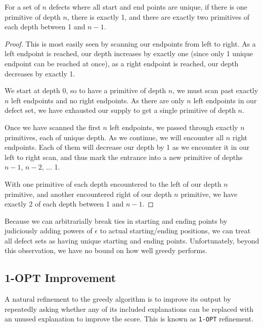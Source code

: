 \begin{lem} \label{lemma: Number of primitives}
For a set of $n$ defects where all start and end points are unique, if there is one primitive of depth $n$, there is exactly 1, and there are exactly two primitives of each depth between 1 and $n-1$.
\end{lem}

\begin{proof}
This is most easily seen by scanning our endpoints from left to right.  As a left endpoint is reached, our depth increases by exactly one (since only 1 unique endpoint can be reached at once), as a right endpoint is reached, our depth decreases by exactly 1.

We start at depth 0, so to have a primitive of depth $n$, we must scan past exactly $n$ left endpoints and no right endpoints.  As there are only $n$ left endpoints in our defect set, we have exhausted our supply to get a single primitive of depth $n$.

Once we have scanned the first $n$ left endpoints, we passed through exactly $n$ primitives, each of unique depth.  As we continue, we will encounter all $n$ right endpoints.  Each of them will decrease our depth by 1 as we encounter it in our left to right scan, and thus mark the entrance into a new primitive of depths $n-1$, $n-2$, ... 1.  

With one primitive of each depth encountered to the left of our depth $n$ primitive, and another encountered right of our depth $n$ primitive, we have exactly 2 of each depth between 1 and $n-1$.
\end{proof}

Because we can arbitrarially break ties in starting and ending points by judiciously adding powers of $\epsilon$ to actual starting/ending positions, we can treat all defect sets as having unique starting and ending points.  Unfortunately, beyond this observation, we have no bound on how well greedy performs.

\subsection{1-OPT Improvement}

A natural refinement to the greedy algorithm is to improve its output by repeatedly asking whether any of its included explanations can be replaced with an unused explanation to improve the score.  This is known as \texttt{1-OPT} refinement.  

